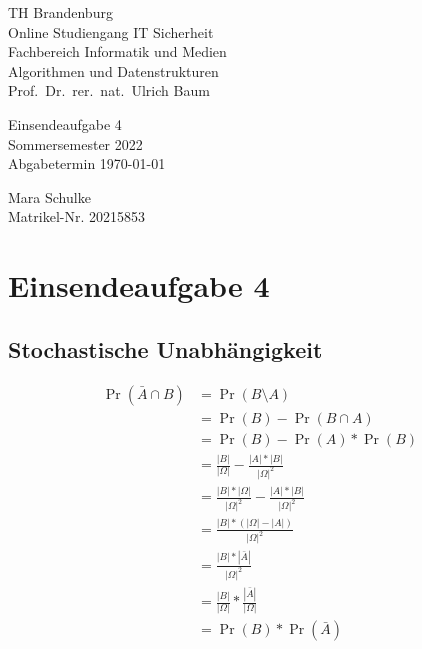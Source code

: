 \documentclass{article}
\begin{document}
\begin{titlepage}
	\begin{flushleft}
		TH Brandenburg\\
		Online Studiengang IT Sicherheit\\
		Fachbereich Informatik und Medien\\
		Algorithmen und Datenstrukturen\\
		Prof.\ Dr.\ rer.\ nat.\ Ulrich Baum
	\end{flushleft}

	\vfill

	\begin{center}
		\Large{Einsendeaufgabe 4}\\[0.5em]
		\large{Sommersemester 2022}\\[0.25em]
		\large{Abgabetermin \today}
	\end{center}

	\vfill

	\begin{flushright}
		Mara Schulke \\
		Matrikel-Nr. 20215853
	\end{flushright}
\end{titlepage}

\newpage

\section*{Einsendeaufgabe 4}

\subsection{Stochastische Unabhängigkeit}

\begin{align*}
	\Pr(\bar{A} \cap B) & = \Pr(B \setminus A)\\
						& = \Pr(B) - \Pr(B \cap A)\\
						& = \Pr(B) - \Pr(A) * \Pr(B)\\
						& = \frac{|B|}{|\Omega|} - \frac{|A| * |B|}{|\Omega|^2}\\
						& = \frac{|B| * |\Omega|}{|\Omega|^2} - \frac{|A| * |B|}{|\Omega|^2}\\
						& = \frac{|B| * (|\Omega| - |A|)}{|\Omega|^2}\\
						& = \frac{|B| * |\bar{A}|}{|\Omega|^2}\\
						& = \frac{|B|}{|\Omega|} * \frac{|\bar{A}|}{|\Omega|}\\
						& = \Pr(B) * \Pr(\bar{A})
\end{align*}
\end{document}
